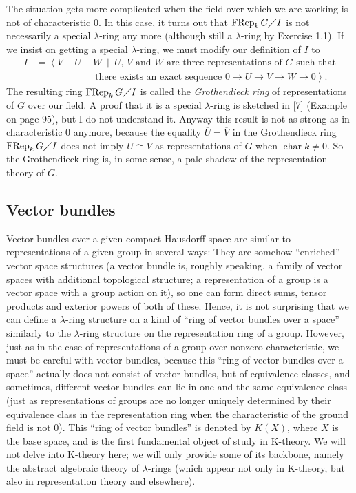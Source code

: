 \documentclass[numbers=enddot,12pt,final,onecolumn,notitlepage]{scrartcl}%
\begin{document}
The situation gets more complicated when the field over which we are working
is not of characteristic $0$. In this case, it turns out that
$\operatorname*{FRep}_{k}G\diagup I$ is not necessarily a special $\lambda
$-ring any more (although still a $\lambda$-ring by Exercise 1.1). If we
insist on getting a special $\lambda$-ring, we must modify our definition of
$I$ to%
\begin{align*}
I  &  =\left\langle V-U-W\ \mid\ U\text{, }V\text{ and }W\text{ are three
representations of }G\text{ such that}\right. \\
&  \ \ \ \ \ \ \ \ \ \ \ \ \ \ \ \ \ \ \ \ \ \ \ \ \ \ \ \ \left.  \text{there
exists an exact sequence }0\rightarrow U\rightarrow V\rightarrow
W\rightarrow0\right\rangle .
\end{align*}
The resulting ring $\operatorname*{FRep}_{k}G\diagup I$ is called the
\textit{Grothendieck ring} of representations of $G$ over our field. A proof
that it is a special $\lambda$-ring is sketched in [7] (Example on page 95),
but I do not understand it. Anyway this result is not as strong as in
characteristic $0$ anymore, because the equality $\overline{U}=\overline{V}$
in the Grothendieck ring $\operatorname*{FRep}_{k}G\diagup I$ does not imply
$U\cong V$ as representations of $G$ when $\operatorname*{char}k\neq0$. So the
Grothendieck ring is, in some sense, a pale shadow of the representation
theory of $G$.

\subsection{Vector bundles}

Vector bundles over a given compact Hausdorff space are similar to
representations of a given group in several ways: They are somehow ``enriched''
vector space structures (a vector bundle is, roughly speaking, a family of
vector spaces with additional topological structure; a representation of a
group is a vector space with a group action on it), so one can form direct
sums, tensor products and exterior powers of both of these. Hence, it is not
surprising that we can define a $\lambda$-ring structure on a kind of ``ring of
vector bundles over a space'' similarly to the $\lambda$-ring structure on the
representation ring of a group. However, just as in the case of
representations of a group over nonzero characteristic, we must be careful
with vector bundles, because this ``ring of vector bundles over a space''
actually does not consist of vector bundles, but of equivalence classes, and
sometimes, different vector bundles can lie in one and the same equivalence
class (just as representations of groups are no longer uniquely determined by
their equivalence class in the representation ring when the characteristic of
the ground field is not $0$). This ``ring of vector bundles'' is denoted by
$K\left(  X\right)  $, where $X$ is the base space, and is the first
fundamental object of study in K-theory. We will not delve into K-theory here;
we will only provide some of its backbone, namely the abstract algebraic
theory of $\lambda$-rings (which appear not only in K-theory, but also in
representation theory and elsewhere).
\end{document}
